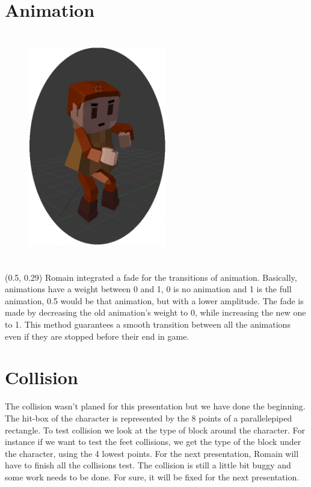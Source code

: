 \documentclass[article]{report} %
\begin{document}
			\section{Animation}
				
				\begin{figure}[h]
				\includegraphics[width=6cm,   height=10cm]{images/Graphics/ex.png}
				\end{figure}
				\begin{textblock}{0.300}(0.5, 0.29)
					 Romain integrated a fade for the transitions of animation. Basically, animations have a weight between 0 and 1, 0 is no animation and 1 is the full animation, 0.5 would be that animation, but with a lower amplitude. The fade is made by decreasing the old animation's weight to 0, while increasing the new one to 1. This method guarantees a smooth transition between all the animations even if they are stopped before their end in game.
				\end{textblock}

			\section{Collision}
				The collision wasn't planed for this presentation but we have done the beginning. The hit-box of the character is represented by the 8 points of a parallelepiped rectangle. To test collision we look at the type of block around the character. For instance if we want to test the feet collisions, we get the type of the block under the character, using the 4 lowest points. For the next presentation, Romain will have to finish all the collisions test. The collision is still a little bit buggy and some work needs to be done. For sure, it will be fixed for the next presentation.
\end{document}
